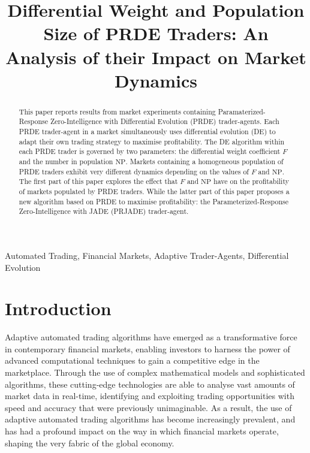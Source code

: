\documentclass[conference]{IEEEtran}
\begin{document}
\title{Differential Weight and Population Size of PRDE Traders: An Analysis of their Impact on Market Dynamics}

\author{
}

\maketitle

\begin{abstract}
This paper reports results from market experiments containing Paramaterized-Response Zero-Intelligence with Differential Evolution (PRDE) trader-agents.
Each PRDE trader-agent in a market simultaneously uses differential evolution (DE) to adapt their own trading strategy to maximise profitability.
The DE algorithm within each PRDE trader is governed by two parameters: the differential weight coefficient $F$ and the number in population $\mathrm{NP}$.
Markets containing a homogeneous population of PRDE traders exhibit very different dynamics depending on the values of $F$ and $\mathrm{NP}$.
The first part of this paper explores the effect that $F$ and $\mathrm{NP}$ have on the profitability of markets populated by PRDE traders.
While the latter part of this paper proposes a new algorithm based on PRDE to maximise profitability: the Parameterized-Response Zero-Intelligence with JADE (PRJADE) trader-agent.

\end{abstract}

\begin{IEEEkeywords}
Automated Trading, Financial Markets, Adaptive Trader-Agents, Differential Evolution
\end{IEEEkeywords}

\section{Introduction}

Adaptive automated trading algorithms have emerged as a transformative force in contemporary financial markets, enabling investors to harness the power of advanced computational techniques to gain a competitive edge in the marketplace.
Through the use of complex mathematical models and sophisticated algorithms, these cutting-edge technologies are able to analyse vast amounts of market data in real-time, identifying and exploiting trading opportunities with speed and accuracy that were previously unimaginable.
As a result, the use of adaptive automated trading algorithms has become increasingly prevalent, and has had a profound impact on the way in which financial markets operate, shaping the very fabric of the global economy.
\end{document}
